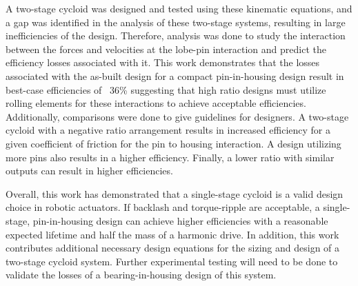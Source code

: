 A two-stage cycloid was designed and tested using these kinematic equations, and a gap was identified in the analysis of these two-stage systems, resulting in large inefficiencies of the design. Therefore, analysis was done to study the interaction between the forces and velocities at the lobe-pin interaction and predict the efficiency losses associated with it. This work demonstrates that the losses associated with the as-built design for a compact pin-in-housing design result in best-case efficiencies of ~36\% suggesting that high ratio designs must utilize rolling elements for these interactions to achieve acceptable efficiencies. Additionally, comparisons were done to give guidelines for designers. A two-stage cycloid with a negative ratio arrangement results in increased efficiency for a given coefficient of friction for the pin to housing interaction. A design utilizing more pins also results in a higher efficiency. Finally, a lower ratio with similar outputs can result in higher efficiencies. 

Overall, this work has demonstrated that a single-stage cycloid is a valid design choice in robotic actuators. If backlash and torque-ripple are acceptable, a single-stage, pin-in-housing design can achieve higher efficiencies with a reasonable expected lifetime and half the mass of a harmonic drive. In addition, this work contributes additional necessary design equations for the sizing and design of a two-stage cycloid system. Further experimental testing will need to be done to validate the losses of a bearing-in-housing design of this system. 

